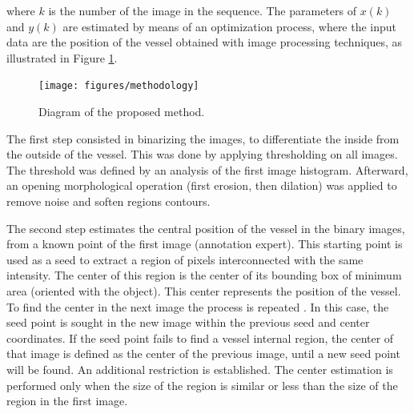 \documentclass[10pt,a4paper,report]{article}
\begin{document}
where $k$ is the number of the image in the sequence.
The parameters of $x(k)$ and $y(k)$ are estimated by means of an optimization process, where the input data are the position of the vessel obtained with image processing techniques, as illustrated in Figure \ref{fig:methodology}.
%
\begin{figure}[h!]
\centering
\texttt{[image: figures/methodology]}
\caption{Diagram of the proposed method.}
\label{fig:methodology}
\end{figure}
%
The first step consisted in binarizing the images, to differentiate the inside from the outside of the vessel. This was done by applying thresholding on all images. The threshold was defined by an analysis of the first image histogram. Afterward, an opening morphological operation (first erosion, then dilation) was applied to remove noise and soften regions contours.


The second step estimates the central position of the vessel in the binary images, from a known point of the first image (annotation expert). This starting point is used as a seed to extract a region of pixels interconnected with the same intensity. The center of this region is the center of its bounding box of minimum area (oriented with the object). This center represents the position of the vessel. To find the center in the next image the process is repeated . In this case, the seed point is sought in the new image within the previous seed and center coordinates. If the seed point fails to find a vessel internal region, the center of that image is defined as the center of the previous image, until a new seed point will be found. An additional restriction is established. The center estimation is performed only when the size of the region is similar or less than the  size of the region in the first image.
\end{document}
